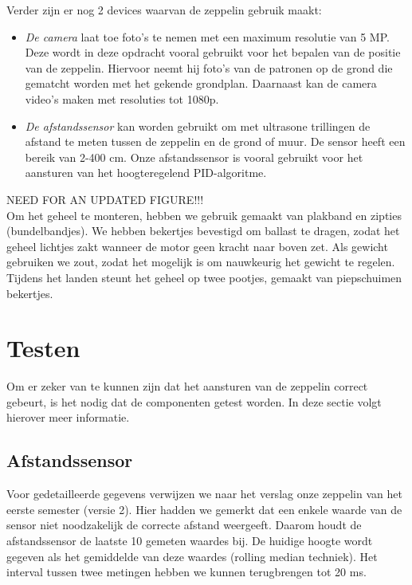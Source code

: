 \documentclass[tt]{penoverslag}
\begin{document}
Verder zijn er nog 2 devices waarvan de zeppelin gebruik maakt:
\begin{itemize}
\item \emph{De camera} laat toe foto's te nemen met een maximum resolutie van 5 MP. Deze wordt in deze opdracht vooral gebruikt voor het bepalen van de positie van de zeppelin. Hiervoor neemt hij foto's van de patronen op de grond die gematcht worden met het gekende grondplan. Daarnaast kan de camera video's maken met resoluties tot 1080p.
\item \emph{De afstandssensor} kan worden gebruikt om met ultrasone trillingen de afstand te meten tussen de zeppelin en de grond of muur. De sensor heeft een bereik van 2-400 cm. Onze afstandssensor is vooral gebruikt voor het aansturen van het hoogteregelend PID-algoritme.  \\
\end{itemize}


{\Large NEED FOR AN UPDATED FIGURE!!! }\\

Om het geheel te monteren, hebben we gebruik gemaakt van plakband en zipties (bundelbandjes). We hebben bekertjes bevestigd om ballast te dragen, zodat het geheel lichtjes zakt wanneer de motor geen kracht naar boven zet. Als gewicht gebruiken we zout, zodat het mogelijk is om nauwkeurig het gewicht te regelen. Tijdens het landen steunt het geheel op twee pootjes, gemaakt van piepschuimen bekertjes. \\

\section{Testen}

Om er zeker van te kunnen zijn dat het aansturen van de zeppelin correct gebeurt, is het nodig dat de componenten getest worden. In deze sectie volgt hierover meer informatie.

\subsection{Afstandssensor}
Voor gedetailleerde gegevens verwijzen we naar het verslag onze zeppelin van het eerste semester (versie 2). Hier hadden we gemerkt dat een enkele waarde van de sensor niet noodzakelijk de correcte afstand weergeeft. Daarom houdt de afstandssensor de laatste 10 gemeten waardes bij. De huidige hoogte wordt gegeven als het gemiddelde van deze waardes (rolling median techniek). Het interval tussen twee metingen hebben we kunnen terugbrengen tot 20 ms.
\end{document}
